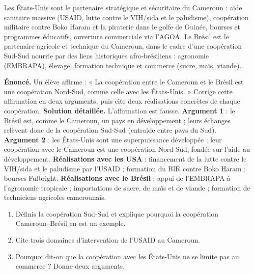 \documentclass[11pt]{article}
\newcommand{\cle}[1]{{\popxbold\color{popdark}#1}}
\begin{document}
\begin{aretenir}
Les États-Unis sont le partenaire \cle{stratégique et sécuritaire} du Cameroun : aide sanitaire massive (USAID, lutte contre le VIH/sida et le paludisme), coopération militaire contre Boko Haram et la piraterie dans le golfe de Guinée, bourses et programmes éducatifs, ouverture commerciale via l'AGOA. Le Brésil est le partenaire \cle{agricole et technique} du Cameroun, dans le cadre d'une coopération \cle{Sud-Sud} nourrie par des liens historiques afro-brésiliens : agronomie (EMBRAPA), élevage, formation technique et commerce (sucre, maïs, viande).
\end{aretenir}

\begin{exoresolu}
\textbf{Énoncé.} Un élève affirme : « La coopération entre le Cameroun et le Brésil est une coopération Nord-Sud, comme celle avec les États-Unis. » Corrige cette affirmation en deux arguments, puis cite deux réalisations concrètes de chaque coopération.
\tcblower
\textbf{Solution détaillée.} L'affirmation est fausse. \textbf{Argument 1} : le Brésil est, comme le Cameroun, un pays en développement ; leurs échanges relèvent donc de la \cle{coopération Sud-Sud} (entraide entre pays du Sud). \textbf{Argument 2} : les États-Unis sont une superpuissance développée ; leur coopération avec le Cameroun est une coopération \cle{Nord-Sud}, fondée sur l'aide au développement. \textbf{Réalisations avec les USA} : financement de la lutte contre le VIH/sida et le paludisme par l'USAID ; formation du BIR contre Boko Haram ; bourses Fulbright. \textbf{Réalisations avec le Brésil} : appui de l'EMBRAPA à l'agronomie tropicale ; importations de sucre, de maïs et de viande ; formation de techniciens agricoles camerounais.
\end{exoresolu}

\begin{exercice}[À faire]
\begin{enumerate}
\item Définis la coopération Sud-Sud et explique pourquoi la coopération Cameroun--Brésil en est un exemple.
\item Cite trois domaines d'intervention de l'USAID au Cameroun.
\item Pourquoi dit-on que la coopération avec les États-Unis ne se limite pas au commerce ? Donne deux arguments.
\end{enumerate}
\end{exercice}
\end{document}
